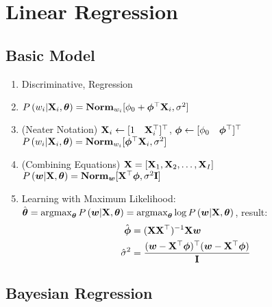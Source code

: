 
\chapter{Linear Regression}
\label{chapter4}

\section{Basic Model}
	\begin{enumerate}
		\item Discriminative, Regression
		\item $P\left(w_i|\text{\bf X}_i,\boldsymbol{\theta}\right)=\mathbf{Norm}_{w_i}[\phi_0+\boldsymbol{\phi}{}^\top\text{\bf X}_i,\sigma^2]$
		\item (Neater Notation) $\text{\bf X}_i\gets[1\quad\text{\bf X}{}^\top_i]{}^\top$, $\boldsymbol{\phi}\gets[\phi_0\quad\boldsymbol{\phi}{}^\top]{}^\top$ \\ $P\left(w_i|\text{\bf X}_i,\boldsymbol{\theta}\right)=\mathbf{Norm}_{w_i}[\boldsymbol{\phi}{}^\top\text{\bf X}_i,\sigma^2]$
		\item (Combining Equations) $\text{\bf X}=[\text{\bf X}_1,\text{\bf X}_2,\dotsc,\text{\bf X}_I]$ \\ $P\left(\boldsymbol{w}|\text{\bf X},\boldsymbol{\theta}\right)=\mathbf{Norm}_{\boldsymbol{w}}[\text{\bf X}{}^\top\boldsymbol{\phi},\sigma^2\text{\bf I}]$
		\item Learning with Maximum Likelihood: $\hat{\vec{\th}}=\argmax_{\vec{\th}}\P{\vec{w}|\mat{X},\vec{\th}}=\argmax_{\vec{\th}}\log\P{\vec{w}|\mat{X},\vec{\th}}$, result:
		\begin{align*}
			\hat{\boldsymbol{\phi}}&=(\text{\bf X}\text{\bf X}{}^\top)^{-1}\text{\bf X}\boldsymbol{w} \\
			\hat{\sigma}^2&=\frac{(\boldsymbol{w}-\text{\bf X}{}^\top\boldsymbol{\phi}){}^\top(\boldsymbol{w}-\text{\bf X}{}^\top\boldsymbol{\phi})}{\text{\bf I}}
		\end{align*}
	\end{enumerate}

\section{Bayesian Regression}

